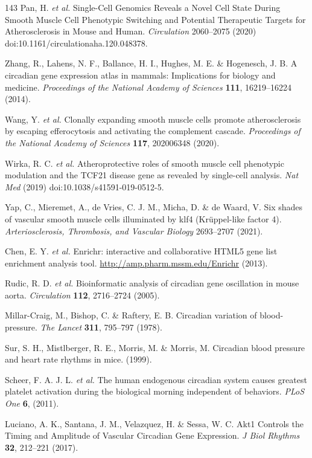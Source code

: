 \documentclass[12pt]{article}
\begin{document}
\begin{thebibliography}{143}
 Pan, H. \textit{et al.} Single-Cell Genomics Reveals a Novel Cell State During Smooth Muscle Cell Phenotypic Switching and Potential Therapeutic Targets for Atherosclerosis in Mouse and Human. \textit{Circulation} 2060--2075 (2020) doi:10.1161/circulationaha.120.048378.

 Zhang, R., Lahens, N. F., Ballance, H. I., Hughes, M. E. \& Hogenesch, J. B. A circadian gene expression atlas in mammals: Implications for biology and medicine. \textit{Proceedings of the National Academy of Sciences} \textbf{111}, 16219--16224 (2014).

 Wang, Y. \textit{et al.} Clonally expanding smooth muscle cells promote atherosclerosis by escaping efferocytosis and activating the complement cascade. \textit{Proceedings of the National Academy of Sciences} \textbf{117}, 202006348 (2020).

 Wirka, R. C. \textit{et al.} Atheroprotective roles of smooth muscle cell phenotypic modulation and the TCF21 disease gene as revealed by single-cell analysis. \textit{Nat Med} (2019) doi:10.1038/s41591-019-0512-5.

 Yap, C., Mieremet, A., de Vries, C. J. M., Micha, D. \& de Waard, V. Six shades of vascular smooth muscle cells illuminated by klf4 (Krüppel-like factor 4). \textit{Arteriosclerosis, Thrombosis, and Vascular Biology} 2693--2707 (2021).

 Chen, E. Y. \textit{et al.} Enrichr: interactive and collaborative HTML5 gene list enrichment analysis tool. \url{http://amp.pharm.mssm.edu/Enrichr} (2013).

 Rudic, R. D. \textit{et al.} Bioinformatic analysis of circadian gene oscillation in mouse aorta. \textit{Circulation} \textbf{112}, 2716--2724 (2005).

 Millar-Craig, M., Bishop, C. \& Raftery, E. B. Circadian variation of blood-pressure. \textit{The Lancet} \textbf{311}, 795--797 (1978).

 Sur, S. H., Mistlberger, R. E., Morris, M. \& Morris, M. Circadian blood pressure and heart rate rhythms in mice. (1999).

 Scheer, F. A. J. L. \textit{et al.} The human endogenous circadian system causes greatest platelet activation during the biological morning independent of behaviors. \textit{PLoS One} \textbf{6}, (2011).

 Luciano, A. K., Santana, J. M., Velazquez, H. \& Sessa, W. C. Akt1 Controls the Timing and Amplitude of Vascular Circadian Gene Expression. \textit{J Biol Rhythms} \textbf{32}, 212--221 (2017).


\end{thebibliography}
\end{document}
